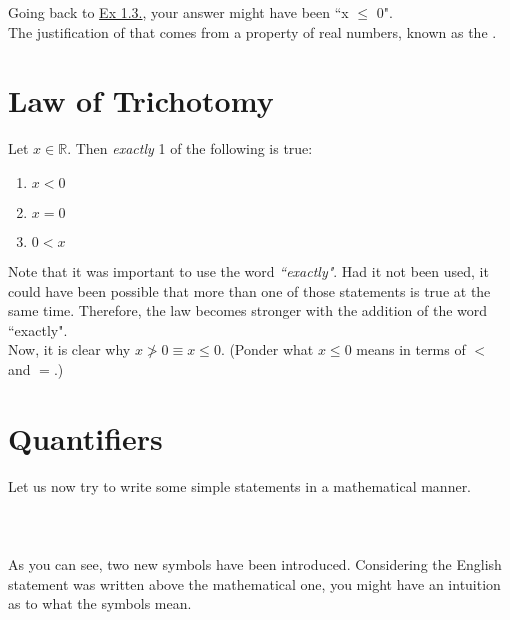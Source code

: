 Going back to \hyperref[ex:1.3]{Ex 1.3.}, your answer might have been ``x $\le$ 0".\\
The justification of that comes from a property of real numbers, known as the .
\section{Law of Trichotomy}\label{sec:LoT}
Let $x \in \mathbb{R}$. Then \textit{exactly} 1 of the following is true:
\begin{enumerate}
    \itemsep0em 
    \item $x < 0$
    \item $x = 0$
    \item $0 < x$
\end{enumerate}
Note that it was important to use the word \textit{``exactly"}. Had it not been used, it could have been possible that more than one of those statements is true at the same time. Therefore, the law becomes stronger with the addition of the word ``exactly".\\
Now, it is clear why $x \not > 0 \equiv x \le 0$. (Ponder what $x \le 0$ means in terms of $<$ and $=$.)

\hrulefill
{}

\hrulefill
\section{Quantifiers}\label{sec:quant}
Let us now try to write some simple statements in a mathematical manner.\\
\\
\\~\\
As you can see, two new symbols have been introduced. Considering the English statement was written above the mathematical one, you might have an intuition as to what the symbols mean.
%
%
